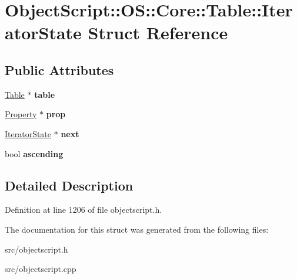 \hypertarget{struct_object_script_1_1_o_s_1_1_core_1_1_table_1_1_iterator_state}{}\section{Object\+Script\+:\+:OS\+:\+:Core\+:\+:Table\+:\+:Iterator\+State Struct Reference}
\label{struct_object_script_1_1_o_s_1_1_core_1_1_table_1_1_iterator_state}
\subsection*{Public Attributes}
\begin{DoxyCompactItemize}
\item 
\hyperlink{struct_object_script_1_1_o_s_1_1_core_1_1_table}{Table} $\ast$ {\bfseries table}\hypertarget{struct_object_script_1_1_o_s_1_1_core_1_1_table_1_1_iterator_state_ae9ef7d6a4f032a09cefe6102c37a13b4}{}\label{struct_object_script_1_1_o_s_1_1_core_1_1_table_1_1_iterator_state_ae9ef7d6a4f032a09cefe6102c37a13b4}

\item 
\hyperlink{struct_object_script_1_1_o_s_1_1_core_1_1_property}{Property} $\ast$ {\bfseries prop}\hypertarget{struct_object_script_1_1_o_s_1_1_core_1_1_table_1_1_iterator_state_aaffde79a5a2770e701aa447870b6a1a7}{}\label{struct_object_script_1_1_o_s_1_1_core_1_1_table_1_1_iterator_state_aaffde79a5a2770e701aa447870b6a1a7}

\item 
\hyperlink{struct_object_script_1_1_o_s_1_1_core_1_1_table_1_1_iterator_state}{Iterator\+State} $\ast$ {\bfseries next}\hypertarget{struct_object_script_1_1_o_s_1_1_core_1_1_table_1_1_iterator_state_a8ef278094d68621195432c24f8964857}{}\label{struct_object_script_1_1_o_s_1_1_core_1_1_table_1_1_iterator_state_a8ef278094d68621195432c24f8964857}

\item 
bool {\bfseries ascending}\hypertarget{struct_object_script_1_1_o_s_1_1_core_1_1_table_1_1_iterator_state_a693c68b3c8029027b06a189a03dd8297}{}\label{struct_object_script_1_1_o_s_1_1_core_1_1_table_1_1_iterator_state_a693c68b3c8029027b06a189a03dd8297}

\end{DoxyCompactItemize}


\subsection{Detailed Description}


Definition at line 1206 of file objectscript.\+h.



The documentation for this struct was generated from the following files\+:\begin{DoxyCompactItemize}
\item 
src/objectscript.\+h\item 
src/objectscript.\+cpp\end{DoxyCompactItemize}
